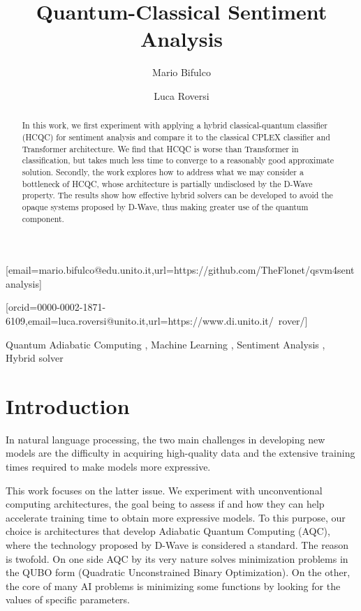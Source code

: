 \documentclass{ceurart}
\begin{document}
\title{Quantum-Classical Sentiment Analysis}
\author[1]{Mario Bifulco}[email=mario.bifulco@edu.unito.it,url=https://github.com/TheFlonet/qsvm4sentanalysis]
\author[1]{Luca Roversi}[orcid=0000-0002-1871-6109,email=luca.roversi@unito.it,url=https://www.di.unito.it/~rover/]
\address[1]{Università degli studi di Torino, Dipartimento di Informatica, Corso Svizzera 185 - 10149 Torino}

\begin{abstract}
    In this work, we first experiment with applying a hybrid classical-quantum classifier (HCQC) for sentiment analysis and compare it to the classical CPLEX classifier and Transformer architecture. We find that HCQC is worse than Transformer in classification, but takes much less time to converge to a reasonably good approximate solution. Secondly, the work explores how to address what we may consider a bottleneck of HCQC, whose architecture is partially undisclosed by the D-Wave property. The results show how effective hybrid solvers can be developed to avoid the opaque systems proposed by D-Wave, thus making greater use of the quantum component.
\end{abstract}
\begin{keywords}
    Quantum Adiabatic Computing \sep 
    Machine Learning \sep
    Sentiment Analysis \sep 
    Hybrid solver 
\end{keywords}

\maketitle

\section{Introduction}
In natural language processing, the two main challenges in developing new models are the difficulty in acquiring high-quality data and the extensive training times required to make models more expressive\cite{scaling}.

This work focuses on the latter issue. We experiment with unconventional computing architectures, the goal being to assess if and how they can help accelerate training time to obtain more expressive models. To this purpose, our choice is architectures that develop Adiabatic Quantum Computing (AQC), where the technology proposed by D-Wave is considered a standard. The reason is twofold. On one side AQC by its very nature solves minimization problems in the QUBO form (Quadratic Unconstrained Binary Optimization). On the other, the core of many AI problems is minimizing some functions by looking for the values of specific parameters.
\end{document}

